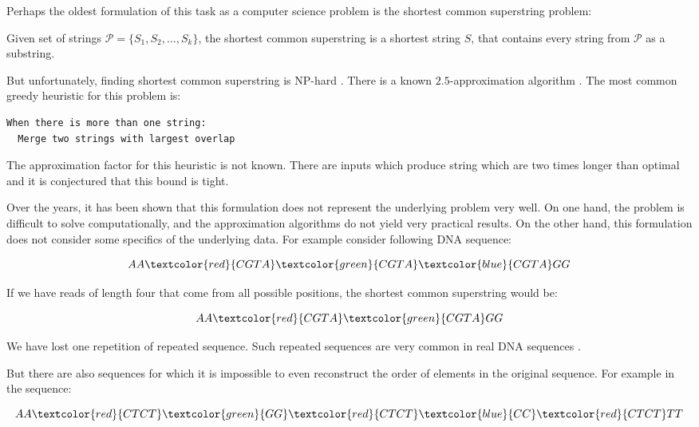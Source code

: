 Perhaps the oldest formulation of this task as a computer science
problem is the shortest common superstring problem:

\begin{definition}
Given set of strings $\mathcal{P} = \{S_1, S_2, \dots, S_k\}$, the shortest
common superstring is a shortest string $S$, that contains every string
from $\mathcal{P}$ as a substring.
\end{definition}

But unfortunately, finding shortest common superstring is NP-hard \citep{SCShard}.
There is a known $2.5$-approximation algorithm \citep{SCSapx}.
The most common greedy heuristic for this problem is:
\begin{verbatim}
When there is more than one string:
  Merge two strings with largest overlap
\end{verbatim}

The approximation factor for this heuristic is not known. There are inputs
which produce string which are two times longer than optimal
and it is conjectured that this bound is tight.

\medskip

Over the years, it has been shown
that this formulation does not represent the underlying problem very well.
On one hand, the problem is difficult to solve computationally, and the
approximation algorithms do not yield very practical results.
On the other hand, this formulation does not consider some specifics of the underlying data.
For example consider following DNA sequence:

$$AA\textcolor{red}{CGTA}\textcolor{green}{CGTA}\textcolor{blue}{CGTA}GG$$

If we have reads of length four that come from all possible positions, the shortest
common superstring would be:

$$AA\textcolor{red}{CGTA}\textcolor{green}{CGTA}GG$$

We have lost one repetition of repeated sequence. Such repeated sequences are
very common in real DNA sequences \citep{DNARep}.


But there are also sequences for which it is impossible to even 
reconstruct the order of elements
in the original sequence. For example in the sequence:

$$AA\textcolor{red}{CTCT}\textcolor{green}{GG}\textcolor{red}{CTCT}\textcolor{blue}{CC}\textcolor{red}{CTCT}TT$$

